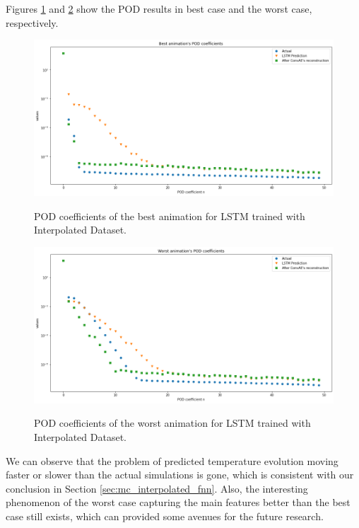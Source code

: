 Figures \ref{figure:LSTM_interpolated_best_POD} and \ref{figure:LSTM_interpolated_worst_POD} show the POD results in best case and the worst case, respectively.

\begin{figure}[H]
    \centering
    \caption{POD coefficients of the best animation for LSTM trained with Interpolated Dataset.}
    \includegraphics[scale=0.4]{figures/mantle_convection_images/larger_dataset_interpolated/LSTM_Best_POD.png}
    \label{figure:LSTM_interpolated_best_POD}
\end{figure}

\begin{figure}[H]
    \centering
    \caption{POD coefficients of the worst animation for LSTM trained with Interpolated Dataset.}
    \includegraphics[scale=0.4]{figures/mantle_convection_images/larger_dataset_interpolated/LSTM_Worst_POD.png}
    \label{figure:LSTM_interpolated_worst_POD}
\end{figure}


We can observe that the problem of predicted temperature evolution moving faster or slower than the actual simulations is gone, which is consistent with our conclusion in Section \ref{sec:mc_interpolated_fnn}. Also, the interesting phenomenon of the worst case capturing the main features better than the best case still exists, which can provided some avenues for the future research.

